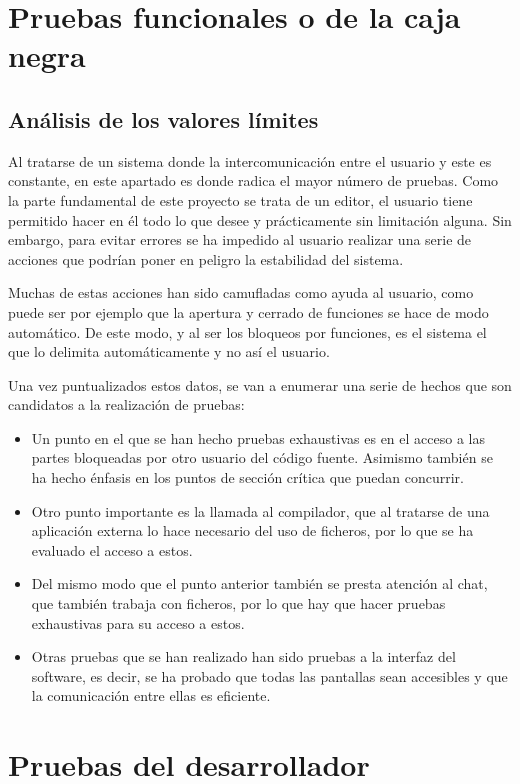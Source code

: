 \section{Pruebas funcionales o de la caja negra}

\subsection{Análisis de los valores límites}

Al tratarse de un sistema donde la intercomunicación entre el usuario y este es constante, en este apartado es donde radica el mayor número de pruebas. Como la parte fundamental de este proyecto se trata de un editor, el usuario tiene permitido hacer en él todo lo que desee y prácticamente sin limitación alguna. Sin embargo, para evitar errores se ha impedido al usuario realizar una serie de acciones que podrían poner en peligro la estabilidad del sistema. 

Muchas de estas acciones han sido camufladas como ayuda al usuario, como puede ser por ejemplo que la apertura y cerrado de funciones se hace de modo automático. De este modo, y al ser los bloqueos por funciones, es el sistema el que lo delimita automáticamente y no así el usuario.

Una vez puntualizados estos datos, se van a enumerar una serie de hechos que son candidatos a la realización de pruebas:

\begin{itemize}
	\item Un punto en el que se han hecho pruebas exhaustivas es en el acceso a las partes bloqueadas por otro usuario del código fuente. Asimismo también se ha hecho énfasis en los puntos de sección crítica que puedan concurrir.
	\item Otro punto importante es la llamada al compilador, que al tratarse de una aplicación externa lo hace necesario del uso de ficheros, por lo que se ha evaluado el acceso a estos.
	\item Del mismo modo que el punto anterior también se presta atención al chat, que también trabaja con ficheros, por lo que hay que hacer pruebas exhaustivas para su acceso a estos.
	\item Otras pruebas que se han realizado han sido pruebas a la interfaz del software, es decir, se ha probado que todas las pantallas sean accesibles y que la comunicación entre ellas es eficiente.
\end{itemize}

\section{Pruebas del desarrollador}	
	
